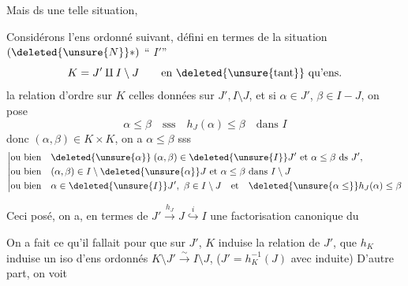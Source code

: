 
 Mais ds une telle situation,

Considérons l'ens ordonné suivant, défini en termes de la situation $(\deleted{\unsure{N}}*)$ `` $I'$''
\[
 K=J'\mathbin{\amalg} I\setminus J\qquad\text{en \deleted{\unsure{tant}} qu'ens.}
\]
la relation d'ordre sur $K$  celles données sur $J',I\setminus J$, et si $\alpha\in J'$, $\beta\in I-J$, on pose
\[
 \alpha\leq\beta\quad\text{sss}\quad h_J(\alpha)\leq\beta\quad\text{dans }I
\]
donc $(\alpha,\beta)\in K\times K$, on a $\alpha\leq\beta$ sss
\[
\left|\begin{aligned}
 &\text{ou bien}\quad \deleted{\unsure{\alpha}}\;(\alpha,\beta)\in\deleted{\unsure{I}}J' \ \text{et}\ \alpha\leq\beta\ \text{ds }J',\\
 &\text{ou bien}\quad (\alpha,\beta)\in I\setminus\deleted{\unsure{\alpha}}J\ \text{et}\ \alpha\leq\beta\ \text{dans }I\setminus J\\
 &\text{ou bien}\quad \alpha\in\deleted{\unsure{I}}J',\ \beta\in I\setminus J\quad\text{et}\quad \deleted{\unsure{\alpha\leq}}h_J(\alpha)\leq\beta
\end{aligned}\right.
\]

Ceci posé, on a, en termes de $J'\xrightarrow{h_J}J\overset{i}{\hookrightarrow}I$ une factorisation canonique du 

On a fait ce qu'il fallait pour que sur $J'$, $K$ induise la relation de $J'$, que $h_K$ induise un iso d'ens ordonnés $K\setminus J'\xrightarrow{\sim}I\setminus J$,     ($J'=h_K^{-1}(J)$ avec  induite) D'autre part, on voit
